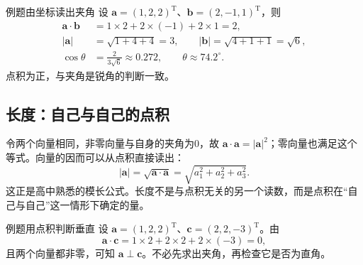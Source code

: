 \documentclass[a4paper,12pt,twoside,openany,fontset=none]{ctexbook}
\newcounter{example}[chapter]
\newenvironment{example}[1][]{\begin{exBox}{例题}{#1}}{\end{exBox}}
\numberwithin{equation}{chapter}
\begin{document}
\begin{example}[由坐标读出夹角]
设 $\boldsymbol{a}=(1,2,2)^{\mathrm T}$、$\boldsymbol{b}=(2,-1,1)^{\mathrm T}$，则
\begin{align}
 \boldsymbol{a}\cdot\boldsymbol{b}&=1\times2+2\times(-1)+2\times1=2,\\
 |\boldsymbol{a}|&=\sqrt{1+4+4}=3,\qquad
 |\boldsymbol{b}|=\sqrt{4+1+1}=\sqrt6,\\
 \cos\theta&=\frac{2}{3\sqrt6}\approx0.272,\qquad \theta\approx74.2^\circ.
\end{align}
点积为正，与夹角是锐角的判断一致。
\end{example}

\subsection*{长度：自己与自己的点积}

令两个向量相同，非零向量与自身的夹角为0，故 $\boldsymbol{a}\cdot\boldsymbol{a}=|\boldsymbol{a}|^2$；零向量也满足这个等式。向量的因而可以从点积直接读出：
\begin{equation}
 |\boldsymbol{a}|=\sqrt{\boldsymbol{a}\cdot\boldsymbol{a}}
 =\sqrt{a_1^2+a_2^2+a_3^2}.
 \label{eq:zero-length-dot}
\end{equation}
这正是高中熟悉的模长公式。长度不是与点积无关的另一个读数，而是点积在“自己与自己”这一情形下确定的量。


\begin{example}[用点积判断垂直]
设 $\boldsymbol{a}=(1,2,2)^{\mathrm T}$、$\boldsymbol{c}=(2,2,-3)^{\mathrm T}$。由
\begin{equation}
 \boldsymbol{a}\cdot\boldsymbol{c}=1\times2+2\times2+2\times(-3)=0,
\end{equation}
且两个向量都非零，可知 $\boldsymbol{a}\perp\boldsymbol{c}$。不必先求出夹角，再检查它是否为直角。
\end{example}
\end{document}
